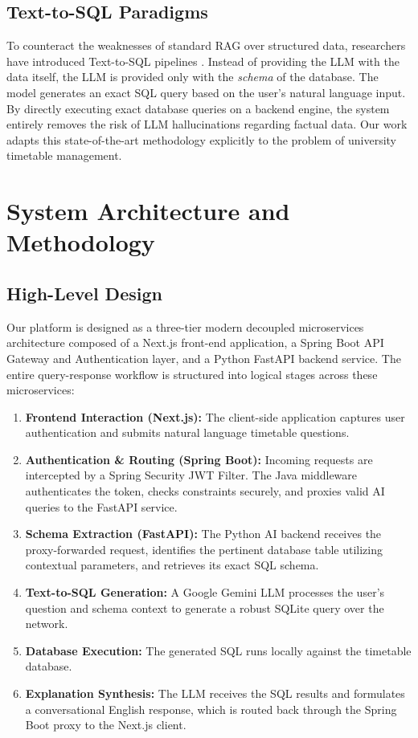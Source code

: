 \documentclass[12pt]{article}
\begin{document}
\subsection{Text-to-SQL Paradigms}
To counteract the weaknesses of standard RAG over structured data, researchers have introduced Text-to-SQL pipelines \cite{llm_sql}. Instead of providing the LLM with the data itself, the LLM is provided only with the \textit{schema} of the database. The model generates an exact SQL query based on the user's natural language input. By directly executing exact database queries on a backend engine, the system entirely removes the risk of LLM hallucinations regarding factual data. Our work adapts this state-of-the-art methodology explicitly to the problem of university timetable management.

\newpage

\section{System Architecture and Methodology}  

\subsection{High-Level Design}
Our platform is designed as a three-tier modern decoupled microservices architecture composed of a Next.js front-end application, a Spring Boot API Gateway and Authentication layer, and a Python FastAPI backend service. The entire query-response workflow is structured into logical stages across these microservices:
\begin{enumerate}
    \item \textbf{Frontend Interaction (Next.js):} The client-side application captures user authentication and submits natural language timetable questions.
    \item \textbf{Authentication \& Routing (Spring Boot):} Incoming requests are intercepted by a Spring Security JWT Filter. The Java middleware authenticates the token, checks constraints securely, and proxies valid AI queries to the FastAPI service.
    \item \textbf{Schema Extraction (FastAPI):} The Python AI backend receives the proxy-forwarded request, identifies the pertinent database table utilizing contextual parameters, and retrieves its exact SQL schema.
    \item \textbf{Text-to-SQL Generation:} A Google Gemini LLM processes the user's question and schema context to generate a robust SQLite query over the network.
    \item \textbf{Database Execution:} The generated SQL runs locally against the timetable database.
    \item \textbf{Explanation Synthesis:} The LLM receives the SQL results and formulates a conversational English response, which is routed back through the Spring Boot proxy to the Next.js client.
\end{enumerate}
\end{document}

